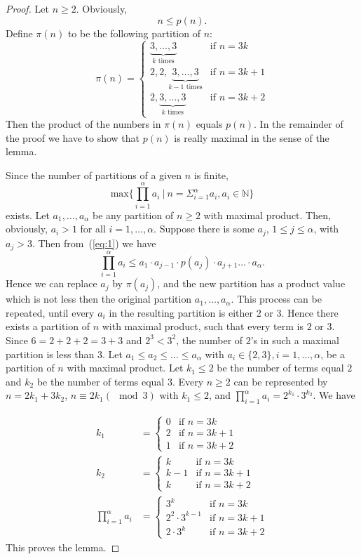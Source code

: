 \begin{proof}
Let $n\ge 2$. Obviously, \begin{equation}\label{eq:1} n\le
p(n).\end{equation} Define $\pi(n)$ to be the following partition  of $n$:
%
$$\pi(n)=\begin{cases} \underbrace{3,\ldots,3}_{k\text{ times}}  &\text{if}\,\, n=3k\\ 2,2,\underbrace{3,\ldots,3}_{k-1\text{ times}}  &\text{if}\,\, n=3k+1\\2,\underbrace{3,\ldots,3}_{k\text{ times}}  &\text{if}\,\, n=3k+2\end{cases}$$
%
Then the product of the numbers in $\pi(n)$ equals  $p(n)$. In the remainder
of the proof we have to show that $p(n)$ is really maximal in the sense of
the lemma.

Since the number of partitions of a given $n$ is finite,
%
$$\text{max}\{\prod_{i=1}^{\alpha}a_i~|~n=\Sigma_{i=1}^{\alpha}a_i, a_i\in \mathbb{N}\}$$
%
exists. Let $a_1, \ldots , a_{\alpha}$ be any partition of $n\ge 2$ with
maximal product. Then, obviously,  $a_i>1$ for all $i=1,\dots,\alpha$.
Suppose there is some $a_j$, $1\le j\le \alpha$, with $a_j>3$. Then
from~(\ref{eq:1}) we have
$$\prod_{i=1}^{\alpha}a_i\le a_1\cdot a_{j-1}\cdot p(a_j)\cdot a_{j+1}\ldots\cdot a_{\alpha}.$$
Hence we can replace $a_j$ by $\pi(a_j)$, and the new partition has  a
product value which is not less then the original partition $a_1, \ldots ,
a_{\alpha}$. This process can be repeated, until every $a_i$ in the resulting
partition is either 2 or 3. Hence there exists a partition of $n$ with
maximal product, such that every term is $2$ or $3$. Since $6=2+2+2=3 + 3$
and $2^3< 3^2$, the number of $2$'s in such a maximal partition is less than
$3$. Let $a_1\le a_2\le \ldots\le  a_{\alpha}$ with $a_i\in \{2,3\},
i=1,\dots,\alpha$, be a partition of $n$ with maximal product. Let $k_1\le 2$
be the number of terms equal $2$ and $k_2$ be the number of terms equal $3$.
Every $n\ge 2$ can be represented by $n=2k_1+3k_2$, $n\equiv 2k_1 (\mod 3)$
with $k_1\le 2$, and $\prod_{i=1}^{\alpha}a_i=2^{k_1}\cdot 3^{k_2}$. We have

\begin{align*}k_1&=\begin{cases} 0 &\text{if}\,\, n=3k\\ 2 &\text{if}\,\, n=3k+1\\1 &\text{if}\,\, n=3k+2\end{cases}\\
 k_2&=\begin{cases} k &\text{if}\,\, n=3k\\ k-1 &\text{if}\,\, n=3k+1\\k &\text{if}\,\, n=3k+2\end{cases}\\
\prod_{i=1}^{\alpha}a_i&=\begin{cases} 3^k &\text{if}\,\, n=3k\\ 2^2\cdot 3^{k-1} &\text{if}\,\, n=3k+1\\2\cdot 3^{k} &\text{if}\,\, n=3k+2\end{cases}\end{align*}
This proves the lemma.
\xbox
\end{proof}
